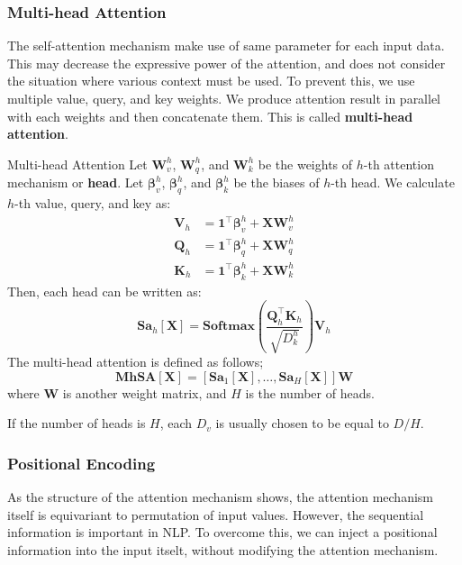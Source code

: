\documentclass{article}
\begin{document}
        \subsubsection{Multi-head Attention}
            The self-attention mechanism make use of same parameter for each input data.
            This may decrease the expressive power of the attention, and does not consider
            the situation where various context must be used.
            To prevent this, we use multiple value, query, and key weights.
            We produce attention result in parallel with each weights and then concatenate them.
            This is called \textbf{multi-head attention}.
            \begin{defn}{Multi-head Attention}
                Let $\textbf{W}_v^h$, $\textbf{W}_q^h$, and $\textbf{W}_k^h$ be the weights of $h$-th attention mechanism or \textbf{head}.
                Let $\bm{\beta}_v^h$, $\bm{\beta}_q^h$, and $\bm{\beta}_k^h$ be the biases of $h$-th head.
                We calculate $h$-th value, query, and key as:
                \begin{align*}
                    \textbf{V}_h &= \textbf{1}^{\top}\bm{\beta}_v^h + \textbf{X}\textbf{W}_v^h \\
                    \textbf{Q}_h &= \textbf{1}^{\top}\bm{\beta}_q^h + \textbf{X}\textbf{W}_q^h \\
                    \textbf{K}_h &= \textbf{1}^{\top}\bm{\beta}_k^h + \textbf{X}\textbf{W}_k^h
                \end{align*}
                Then, each head can be written as:
                \[
                    \textbf{Sa}_h[\textbf{X}]=\textbf{Softmax}\left(\frac{\textbf{Q}_h^{\top}\textbf{K}_h}{\sqrt{D_k^h}}\right)\textbf{V}_h
                \]
                The multi-head attention is defined as follows;
                \[
                    \textbf{MhSA}[\textbf{X}] = [\textbf{Sa}_1[\textbf{X}], \dots, \textbf{Sa}_H[\textbf{X}]]\textbf{W}
                \]
                where \textbf{W} is another weight matrix, and $H$ is the number of heads.
            \end{defn}
            If the number of heads is $H$, each $D_v$ is usually chosen to be equal to $D/H$.

        \subsubsection{Positional Encoding}
            As the structure of the attention mechanism shows, the attention mechanism itself is equivariant to
            permutation of input values. However, the sequential information is important in NLP. To overcome this,
            we can inject a positional information into the input itselt, without modifying the attention mechanism.
\end{document}
